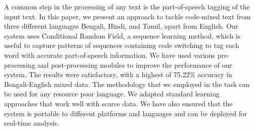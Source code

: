 A common step in the processing of any text is the part-of-speech tagging of the input text. In this paper, we present an approach to tackle code-mixed text from three different languages Bengali, Hindi, and Tamil, apart from  English. Our system uses Conditional Random Field, a sequence learning method, which is useful to capture patterns of sequences containing code switching to tag each word with accurate part-of-speech information. We have used various pre-processing and post-processing modules to improve the performance of our system. The results were satisfactory, with a highest of 75.22\% accuracy in Bengali-English mixed data. The methodology that we employed in the task can be used for any resource poor language. We adapted standard learning approaches that work well with scarce data. We have also ensured that the system is portable to different platforms and languages and can be deployed for real-time analysis.
